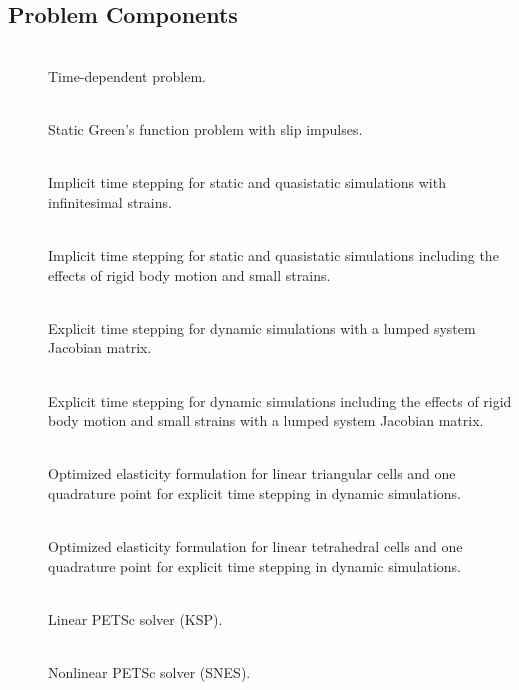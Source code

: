 \subsection{Problem Components}
\begin{description}
\item [] \\
Time-dependent problem.
\item [] \\
Static Green's function problem with slip impulses.
\item [] \\
Implicit time stepping for static and quasistatic simulations with
infinitesimal strains.
\item [] \\
Implicit time stepping for static and quasistatic simulations including
the effects of rigid body motion and small strains.
\item [] \\
Explicit time stepping for dynamic simulations with a lumped system
Jacobian matrix.
\item [] \\
Explicit time stepping for dynamic simulations including the effects
of rigid body motion and small strains with a lumped system Jacobian
matrix.
\item [] \\
Optimized elasticity formulation for linear triangular cells and one
quadrature point for explicit time stepping in dynamic simulations.
\item [] \\
Optimized elasticity formulation for linear tetrahedral cells and
one quadrature point for explicit time stepping in dynamic simulations.
\item [] \\
Linear PETSc solver (KSP).
\item [] \\
Nonlinear PETSc solver (SNES).

\end{description}
